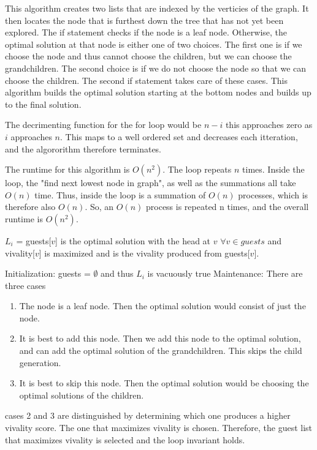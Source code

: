 \documentclass{article}
\begin{document}
This algorithm creates two lists that are indexed by the verticies of the graph. It then locates the node that is furthest down the tree that has not yet been explored. The if statement checks if the node is a leaf node. Otherwise, the optimal solution at that node is either one of two choices. The first one is if we choose the node and thus cannot choose the children, but we can choose the grandchildren. The second choice is if we do not choose the node so that we can choose the children. The second if statement takes care of these cases. This algorithm builds the optimal solution starting at the bottom nodes and builds up to the final solution.

The decrimenting function for the for loop would be $n - i$ this approaches zero as $i$
 approaches $n$. This maps to a well ordered set and decreases each itteration, and the algororithm therefore terminates.
 
 The runtime for this algorithm is $O(n^2)$. The loop repeats $n$ times. Inside the loop, the "find next lowest node in graph", as well as the summations all take $O(n)$ time. Thus, inside the loop is a summation of $O(n)$ processes, which is therefore also $O(n)$. So, an $O(n)$ process is repeated n times, and the overall runtime is $O(n^2)$.
 

 $L_i$ = guests[$v$] is the optimal solution with the head at $v$ $\forall v \in guests$ and vivality[$v$] is maximized and is the vivality produced from guests[$v$].
 
 Initialization: guests = $\emptyset$ and thus $L_i$ is vacuously true
 Maintenance: There are three cases
 \begin{enumerate}[1.]
 \item The node is a leaf node. Then the optimal solution would consist of just the node.
 \item It is best to add this node. Then we add this node to the optimal solution, and can add the optimal solution of the grandchildren. This skips the child generation.
 \item It is best to skip this node. Then the optimal solution would be choosing the optimal solutions of the children.
 \end{enumerate}
 cases 2 and 3 are distinguished by determining which one produces a higher vivality score. The one that maximizes vivality is chosen. Therefore, the guest list that maximizes vivality is selected and the loop invariant holds.
 
\end{document}
